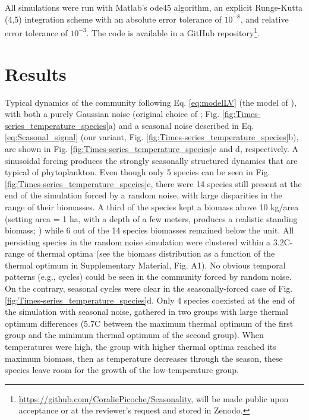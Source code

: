 \documentclass[a4paper,12pt]{article}
\begin{document}
All simulations were run with Matlab's ode45 algorithm, an explicit
Runge-Kutta (4,5) integration scheme with an absolute error tolerance
of $10^{-8}$, and relative error tolerance of $10^{-3}$. The code
is available in a GitHub repository\footnote{\url{https://github.com/CoraliePicoche/Seasonality}, will be made
public upon acceptance or at the reviewer's request and stored in
Zenodo.}.
 
\section*{Results}

Typical dynamics of the community following Eq. \ref{eq:modelLV}
(the model of \citealp{scranton_coexistence_2016}), with both a purely
Gaussian noise (original choice of \citealp{scranton_coexistence_2016};
Fig. \ref{fig:Times-series_temperature_species}a) and a seasonal
noise described in Eq. \ref{eq:Seasonal_signal} (our variant, Fig.
\ref{fig:Times-series_temperature_species}b), are shown in Fig. \ref{fig:Times-series_temperature_species}c
and d, respectively. A sinusoidal forcing produces the strongly seasonally
structured dynamics that are typical of phytoplankton. Even though
only 5 species can be seen in Fig. \ref{fig:Times-series_temperature_species}c,
there were 14 species still present at the end of the simulation forced
by a random noise, with large disparities in the range of their biomasses.
A third of the species kept a biomass above 10 kg/area (setting area
= 1 ha, with a depth of a few meters, produces a realistic standing
biomass; \citealp{reynolds2006ecology}) while 6 out of the 14 species
biomasses remained below the unit. All persisting species in the random
noise simulation were clustered within a 3.2\textdegree C-range of thermal optima
(see the biomass distribution as a function of the thermal optimum
in Supplementary Material, Fig. A1). No obvious temporal patterns
(e.g., cycles) could be seen in the community forced by random noise.
On the contrary, seasonal cycles were clear in the seasonally-forced
case of Fig. \ref{fig:Times-series_temperature_species}d. Only 4
species coexisted at the end of the simulation with seasonal noise,
gathered in two groups with large thermal optimum differences (5.7\textdegree C
between the maximum thermal optimum of the first group and the minimum
thermal optimum of the second group). When temperatures were high,
the group with higher thermal optima reached its maximum biomass,
then as temperature decreases through the season, these species leave
room for the growth of the low-temperature group.
\end{document}

